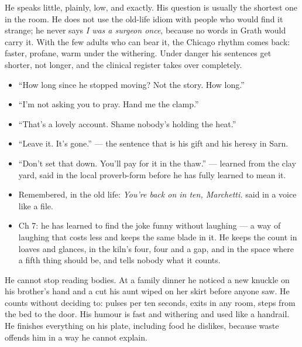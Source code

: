 \documentclass{design/chronicle}
\begin{document}
{
He speaks little, plainly, low, and exactly. His question is usually the shortest one in the room. He does not use the old-life idiom with people who would find it strange; he never says \emph{I was a surgeon once}, because no words in Grath would carry it. With the few adults who can bear it, the Chicago rhythm comes back: faster, profane, warm under the withering. Under danger his sentences get shorter, not longer, and the clinical register takes over completely.

\begin{itemize}[leftmargin=1.4em,itemsep=1pt,topsep=3pt,parsep=0pt]

\item “How long since he stopped moving? Not the story. How long.”

\item “I’m not asking you to pray. Hand me the clamp.”

\item “That’s a lovely account. Shame nobody’s holding the heat.”

\item “Leave it. It’s gone.” — the sentence that is his gift and his heresy in Sarn.

\item “Don’t set that down. You’ll pay for it in the thaw.” — learned from the clay yard, said in the local proverb-form before he has fully learned to mean it.

\item Remembered, in the old life: \emph{You’re back on in ten, Marchetti.} said in a voice like a file.

\item Ch 7: he has learned to find the joke funny without laughing --- a way of laughing that costs less and keeps the same blade in it. He keeps the count in loaves and glances, in the kiln’s four, four and a gap, and in the space where a fifth thing should be, and tells nobody what it counts.

\end{itemize}

He cannot stop reading bodies. At a family dinner he noticed a new knuckle on his brother’s hand and a cut his aunt wiped on her skirt before anyone saw. He counts without deciding to: pulses per ten seconds, exits in any room, steps from the bed to the door. His humour is fast and withering and used like a handrail. He finishes everything on his plate, including food he dislikes, because waste offends him in a way he cannot explain.

}
\end{document}

